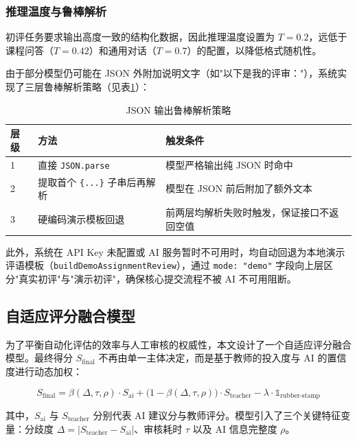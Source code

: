 \documentclass[12pt,a4paper,oneside]{ctexbook}
\numberwithin{equation}{chapter}
\begin{document}
\subsubsection{推理温度与鲁棒解析}

初评任务要求输出高度一致的结构化数据，因此推理温度设置为 $T=0.2$，远低于课程问答（$T=0.42$）和通用对话（$T=0.7$）的配置，以降低格式随机性。

由于部分模型仍可能在 JSON 外附加说明文字（如"以下是我的评审："），系统实现了三层鲁棒解析策略（见表\ref{tab:jsonParsing}）：

\begin{table}[H]
\centering
\caption{JSON 输出鲁棒解析策略}
\label{tab:jsonParsing}
\begin{tabular}{p{1cm}p{4cm}p{8cm}}
\toprule
层级 & 方法 & 触发条件 \\
\midrule
1 & 直接 \texttt{JSON.parse} & 模型严格输出纯 JSON 时命中 \\
2 & 提取首个 \texttt{\{...\}} 子串后再解析 & 模型在 JSON 前后附加了额外文本 \\
3 & 硬编码演示模板回退 & 前两层均解析失败时触发，保证接口不返回空值 \\
\bottomrule
\end{tabular}
\end{table}

此外，系统在 API Key 未配置或 AI 服务暂时不可用时，均自动回退为本地演示评语模板（\texttt{buildDemoAssignmentReview}），通过 \texttt{mode: "demo"} 字段向上层区分"真实初评"与"演示初评"，确保核心提交流程不被 AI 不可用阻断。

\subsection{自适应评分融合模型}
为了平衡自动化评估的效率与人工审核的权威性，本文设计了一个自适应评分融合模型。最终得分 $S_{\text{final}}$ 不再由单一主体决定，而是基于教师的投入度与 AI 的置信度进行动态加权：

\begin{equation}
S_{\text{final}} = \beta(\Delta, \tau, \rho) \cdot S_{\text{ai}} + \bigl(1 - \beta(\Delta, \tau, \rho)\bigr) \cdot S_{\text{teacher}} - \lambda \cdot \mathbb{1}_{\text{rubber-stamp}}
\label{eq:scoreFusion}
\end{equation}

其中，$S_{\text{ai}}$ 与 $S_{\text{teacher}}$ 分别代表 AI 建议分与教师评分。模型引入了三个关键特征变量：分歧度 $\Delta = |S_{\text{teacher}} - S_{\text{ai}}|$、审核耗时 $\tau$ 以及 AI 信息完整度 $\rho$。
\end{document}
